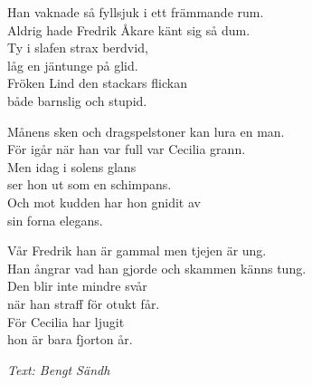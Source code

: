\vspace{10pt}
Han vaknade så fyllsjuk i ett främmande rum.\\
Aldrig hade Fredrik Åkare känt sig så dum.\\
Ty i slafen strax berdvid,\\
låg en jäntunge på glid.\\
Fröken Lind den stackars flickan\\
både barnslig och stupid.\par
\vspace{10pt}
Månens sken och dragspelstoner kan lura en man.\\
För igår när han var full var Cecilia grann.\\
Men idag i solens glans\\
ser hon ut som en schimpans.\\
Och mot kudden har hon gnidit av\\
sin forna elegans.\par
\vspace{10pt}
Vår Fredrik han är gammal men tjejen är ung.\\
Han ångrar vad han gjorde och skammen känns tung.\\
Den blir inte mindre svår\\
när han straff för otukt får.\\
För Cecilia har ljugit\\
hon är bara fjorton år.\par
\vspace{10pt}
{\footnotesize\textit{Text: Bengt Sändh}}
